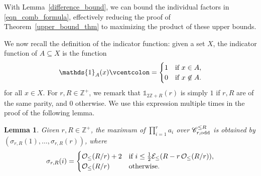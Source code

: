 \documentclass[11pt]{amsart}
\newcommand{\defeq}{\vcentcolon=}
\newtheorem{lemma}[theorem]{Lemma}
\newcommand{\ZZ}{\mathbb{Z}}
\DeclareMathOperator{\oddleq}{\mathcal{O}_{\leq}}
\DeclareMathOperator{\evenleq}{\mathcal{E}_{\leq}}
\begin{document}
With Lemma~\ref{difference_bound}, we can bound the individual factors in \eqref{eqn_comb_formula}, effectively reducing the proof of Theorem~\ref{upper_bound_thm} to maximizing the product of these upper bounds. 

We now recall the definition of the indicator function: given a set $X$, the indicator function of $A\subseteq X$ is the function
    \begin{align*}
        \mathds{1}_{A}(x)\defeq\begin{cases}
            1 & \text{if~}x\in A,\\
            0 & \text{if~}x\not\in A.
        \end{cases}
    \end{align*}
for all $x\in X$. For $r,R\in\ZZ^+$, we remark that $\mathds{1}_{2\ZZ+R}(r)$ is simply $1$ if $r,R$ are of the same parity, and $0$ otherwise. We use this expression multiple times in the proof of the following lemma.


\begin{lemma}\label{maximizing_lemma}
    Given $r,R\in\ZZ^+$, the maximum of $\prod_{i=1}^{r}a_i$ over $\mathscr{C}_{r,\text{\normalfont odd}}^{\leq R}$ is obtained by $(\sigma_{r,R}(1),\dots,\sigma_{r,R}(r))$, where
    \begin{align*}
        \sigma_{r,R}(i)=
        \begin{cases}
            \oddleq\mleft(R/r\mright)+2 & \text{\normalfont if~}i\leq \frac{1}{2}{\evenleq\mleft(R-r\oddleq\mleft(R/r\mright)\mright),}\\
            \oddleq\mleft(R/r\mright) & \text{\normalfont otherwise.}
        \end{cases}
    \end{align*}
\end{lemma}
\end{document}
